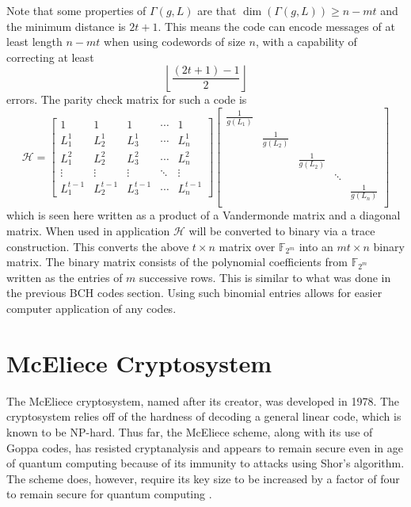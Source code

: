 Note that some properties of $\Gamma(g, L)$ are that $\dim(\Gamma(g, L)) \geq n - mt$ and the minimum distance is $2t + 1$. This means the code can encode messages of at least length $n - mt$ when using codewords of size $n$, with a capability of correcting at least
\[
    \left\lfloor\frac{(2t + 1) - 1}{2}\right\rfloor
\]
errors. The parity check matrix for such a code is
\[
    \mathscr{H} = \left[\begin{array}{ccccc}
        1 & 1 & 1 & \cdots & 1\\
        L_1^1 & L_2^1 & L_3^1 & \cdots & L_n^1\\
        L_1^2 & L_2^2 & L_3^2 & \cdots & L_n^2\\
        \vdots & \vdots & \vdots & \ddots & \vdots\\
        L_1^{t - 1} & L_2^{t - 1} & L_3^{t - 1} & \cdots & L_n^{t - 1}
    \end{array}\right]\left[\begin{array}{ccccc}
        \frac{1}{g(L_1)} &  &  &  & \\
         & \frac{1}{g(L_2)} &  &  & \\
         &  & \frac{1}{g(L_2)} &  & \\
         &  &  & \ddots & \\
         &  &  &  & \frac{1}{g(L_n)}\\
    \end{array}\right]
\]
which is seen here written as a product of a Vandermonde matrix and a diagonal matrix. When used in application $\mathscr{H}$ will be converted to binary via a trace construction. This converts the above $t \times n$ matrix over $\mathbb{F}_{2^m}$ into an $mt \times n$ binary matrix. The binary matrix consists of the polynomial coefficients from $\mathbb{F}_{2^m}$ written as the entries of $m$ successive rows. This is similar to what was done in the previous BCH codes section. Using such binomial entries allows for easier computer application of any codes.

\section{McEliece Cryptosystem}

The McEliece cryptosystem, named after its creator, was developed in 1978. The cryptosystem relies off of the hardness of decoding a general linear code, which is known to be NP-hard. Thus far, the McEliece scheme, along with its use of Goppa codes, has resisted cryptanalysis and appears to remain secure even in age of quantum computing because of its immunity to attacks using Shor's algorithm. The scheme does, however, require its key size to be increased by a factor of four to remain secure for quantum computing \cite{10.1007/978-3-642-12929-2_6}.

